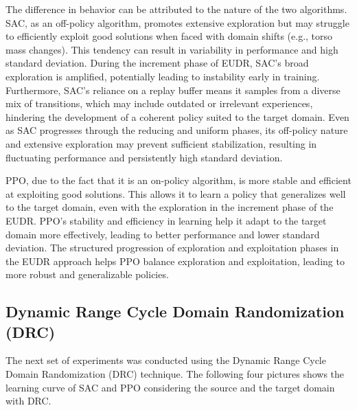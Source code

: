 \documentclass[12pt]{article}
\begin{document}
The difference in behavior can be attributed to the nature of the two algorithms. SAC, as an off-policy algorithm, promotes extensive exploration but may struggle to efficiently exploit good solutions when faced with domain shifts (e.g., torso mass changes). This tendency can result in variability in performance and high standard deviation. During the increment phase of EUDR, SAC's broad exploration is amplified, potentially leading to instability early in training. Furthermore, SAC's reliance on a replay buffer means it samples from a diverse mix of transitions, which may include outdated or irrelevant experiences, hindering the development of a coherent policy suited to the target domain. Even as SAC progresses through the reducing and uniform phases, its off-policy nature and extensive exploration may prevent sufficient stabilization, resulting in fluctuating performance and persistently high standard deviation.

PPO, due to the fact that it is an on-policy algorithm, is more stable and efficient at exploiting good solutions. This allows it to learn a policy that generalizes well to the target domain, even with the exploration in the increment phase of the EUDR. PPO’s stability and efficiency in learning help it adapt to the target domain more effectively, leading to better performance and lower standard deviation. The structured progression of exploration and exploitation phases in the EUDR approach helps PPO balance exploration and exploitation, leading to more robust and generalizable policies.

\subsection{Dynamic Range Cycle Domain Randomization (DRC)}

The next set of experiments was conducted using the Dynamic Range Cycle Domain Randomization (DRC) technique. The following four pictures shows the learning curve of SAC and PPO considering the source and the target domain with DRC.
\end{document}
